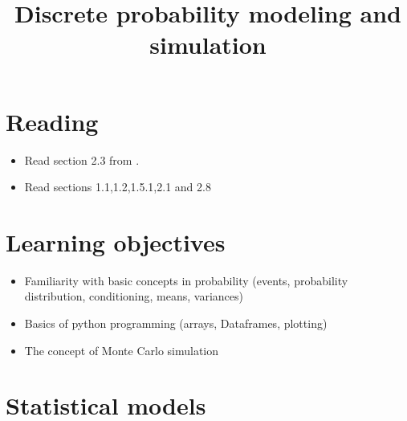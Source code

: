 




\title{Discrete probability modeling and simulation}
\maketitle

\section{Reading}
\begin{itemize}
\item Read section 2.3 from \cite{islp}.
\item Read sections 1.1,1.2,1.5.1,2.1 and 2.8 \cite{tabak}
\end{itemize}

\section{Learning objectives}

\begin{itemize}
\item Familiarity with basic concepts in probability (events, probability distribution, conditioning, means, variances)
\item Basics of python programming (arrays, Dataframes, plotting)
\item The concept of Monte Carlo simulation
\end{itemize}




\section{Statistical models}

